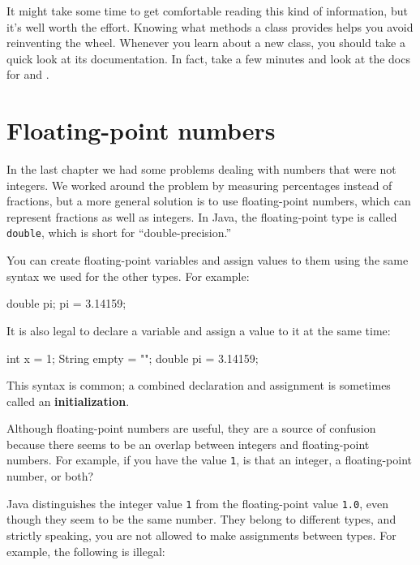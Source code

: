 It might take some time to get comfortable reading this kind of information, but it's well worth the effort.
Knowing what methods a class provides helps you avoid reinventing the wheel.
Whenever you learn about a new class, you should take a quick look at its documentation.
In fact, take a few minutes and look at the docs for  and .


\section{Floating-point numbers}

In the last chapter we had some problems dealing with numbers that were not integers.
We worked around the problem by measuring percentages instead of fractions, but a more general solution is to use floating-point numbers, which can represent fractions as well as integers.
In Java, the floating-point type is called {\tt double}, which is short for ``double-precision.''

You can create floating-point variables and assign values to them using the same syntax we used for the other types.
For example:

\begin{code}
    double pi;
    pi = 3.14159;
\end{code}

It is also legal to declare a variable and assign a value to it at the same time:

\begin{code}
    int x = 1;
    String empty = "";
    double pi = 3.14159;
\end{code}


This syntax is common; a combined declaration and assignment is sometimes called an {\bf initialization}.

Although floating-point numbers are useful, they are a source of confusion because there seems to be an overlap between integers and floating-point numbers.
For example, if you have the value {\tt 1}, is that an integer, a floating-point number, or both?

Java distinguishes the integer value {\tt 1} from the floating-point value {\tt 1.0}, even though they seem to be the same number.
They belong to different types, and strictly speaking, you are not allowed to make assignments between types.
For example, the following is illegal:

